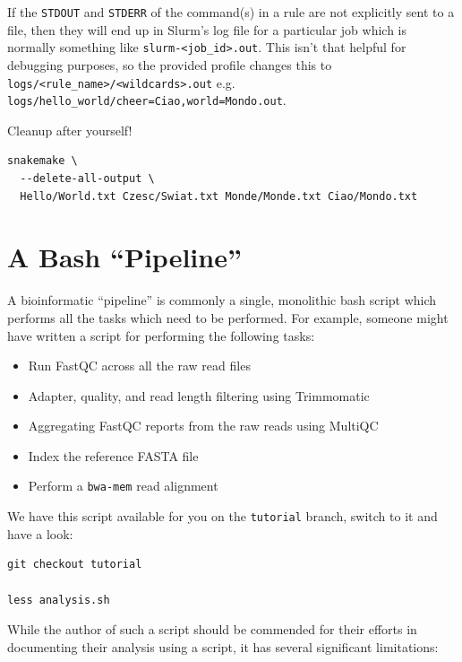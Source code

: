 If the \texttt{STDOUT} and \texttt{STDERR} of the command(s) in a rule are not explicitly sent to a file, then they will
end up in Slurm's log file for a particular job which is normally something like \texttt{slurm-<job\_id>.out}. This isn't
that helpful for debugging purposes, so the provided profile changes this to \texttt{logs/<rule\_name>/<wildcards>.out}
e.g. \texttt{logs/hello\_world/cheer=Ciao,world=Mondo.out}.

Cleanup after yourself!

\begin{lstlisting}
snakemake \
  --delete-all-output \
  Hello/World.txt Czesc/Swiat.txt Monde/Monde.txt Ciao/Mondo.txt
\end{lstlisting}

\section{A Bash ``Pipeline''}

A bioinformatic ``pipeline'' is commonly a single, monolithic bash script which performs all the tasks which need
to be performed. For example, someone might have written a script for performing the following tasks:

\begin{itemize}
  \item Run FastQC across all the raw read files
  \item Adapter, quality, and read length filtering using Trimmomatic
  \item Aggregating FastQC reports from the raw reads using MultiQC
  \item Index the reference FASTA file
  \item Perform a \texttt{bwa-mem} read alignment
\end{itemize}

We have this script available for you on the \texttt{tutorial} branch, switch to it and have a look:

\begin{lstlisting}
git checkout tutorial

less analysis.sh
\end{lstlisting}

While the author of such a script should be commended for their efforts in documenting their analysis using a script,
it has several significant limitations:

